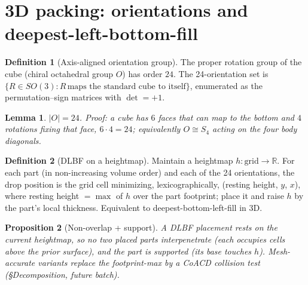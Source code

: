 \documentclass[11pt]{article}
\theoremstyle{definition}\newtheorem{definition}{Definition}[section]
\theoremstyle{plain}\newtheorem{theorem}{Theorem}[section]
\newtheorem{lemma}[theorem]{Lemma}\newtheorem{proposition}[theorem]{Proposition}
\newcommand{\R}{\mathbb{R}}\newcommand{\Z}{\mathbb{Z}}\newcommand{\Norm}[1]{\lVert #1\rVert}
\begin{document}
\section{3D packing: orientations and deepest-left-bottom-fill}
\begin{definition}[Axis-aligned orientation group]
The proper rotation group of the cube (chiral octahedral group $O$) has order $24$. The 24-orientation set is
$\{R\in SO(3): R\,\text{maps the standard cube to itself}\}$, enumerated as the permutation--sign matrices
with $\det=+1$.
\end{definition}
\begin{lemma}
$|O|=24$. \emph{Proof:} a cube has $6$ faces that can map to the bottom and $4$ rotations fixing that face,
$6\cdot4=24$; equivalently $O\cong S_4$ acting on the four body diagonals.
\end{lemma}
\begin{definition}[DLBF on a heightmap]
Maintain a heightmap $h:\text{grid}\to\R$. For each part (in non-increasing volume order) and each of the 24
orientations, the drop position is the grid cell minimizing, lexicographically, (resting height, $y$, $x$),
where resting height $=\max$ of $h$ over the part footprint; place it and raise $h$ by the part's local
thickness. Equivalent to deepest-bottom-left-fill in 3D.
\end{definition}
\begin{proposition}[Non-overlap + support]
A DLBF placement rests on the current heightmap, so no two placed parts interpenetrate (each occupies cells
above the prior surface), and the part is supported (its base touches $h$). Mesh-accurate variants replace the
footprint-max by a CoACD collision test (\S Decomposition, future batch).
\end{proposition}
\end{document}
